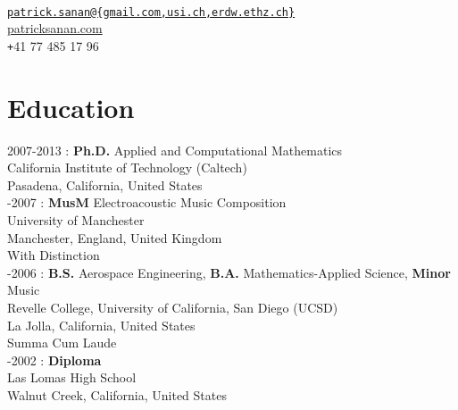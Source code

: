 \documentclass[12pt]{article}
\begin{document}
\thispagestyle{firstpagestyle}
\pagestyle{fancy}

\begin{center}
\vspace{10px}{\Large Patrick Sanan}\\
\vspace{10px}
{\tt \href{mailto:patrick.sanan@gmail.com}{patrick.sanan@\{gmail.com,usi.ch,erdw.ethz.ch\}}}\\
{\href{http://www.patricksanan.com}{patricksanan.com}}\\
{\texttt +41 77 485 17 96}
\end{center}

\section*{Education}

2007-2013 : \textbf{Ph.D.} Applied and Computational Mathematics\\
California Institute of Technology (Caltech)\\
Pasadena, California, United States \\

-2007 : \textbf{MusM} Electroacoustic Music Composition\\
University of Manchester\\
Manchester, England, United Kingdom\\
With Distinction \\

-2006 : \textbf{B.S.} Aerospace Engineering, \textbf{B.A.} Mathematics-Applied Science, \textbf{Minor} Music\\
Revelle College, University of California, San Diego (UCSD)\\
La Jolla, California, United States\\
Summa Cum Laude\\

-2002 : \textbf{Diploma}\\
Las Lomas High School\\
Walnut Creek, California, United States\\
\end{document}
